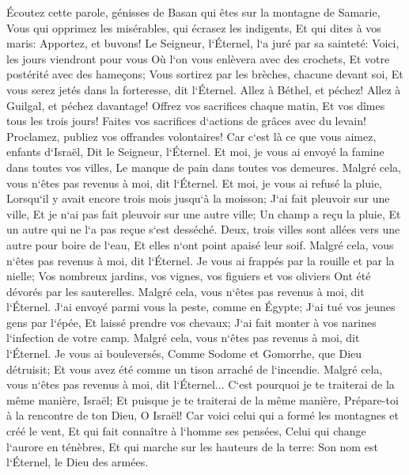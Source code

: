 \verse Écoutez cette parole, génisses de Basan qui êtes sur la montagne de Samarie, Vous qui opprimez les misérables, qui écrasez les indigents, Et qui dites à vos maris: Apportez, et buvons! 
\verse Le Seigneur, l`Éternel, l`a juré par sa sainteté: Voici, les jours viendront pour vous Où l`on vous enlèvera avec des crochets, Et votre postérité avec des hameçons; 
\verse Vous sortirez par les brèches, chacune devant soi, Et vous serez jetés dans la forteresse, dit l`Éternel. 
\verse Allez à Béthel, et péchez! Allez à Guilgal, et péchez davantage! Offrez vos sacrifices chaque matin, Et vos dîmes tous les trois jours! 
\verse Faites vos sacrifices d`actions de grâces avec du levain! Proclamez, publiez vos offrandes volontaires! Car c`est là ce que vous aimez, enfants d`Israël, Dit le Seigneur, l`Éternel. 
\verse Et moi, je vous ai envoyé la famine dans toutes vos villes, Le manque de pain dans toutes vos demeures. Malgré cela, vous n`êtes pas revenus à moi, dit l`Éternel. 
\verse Et moi, je vous ai refusé la pluie, Lorsqu`il y avait encore trois mois jusqu`à la moisson; J`ai fait pleuvoir sur une ville, Et je n`ai pas fait pleuvoir sur une autre ville; Un champ a reçu la pluie, Et un autre qui ne l`a pas reçue s`est desséché. 
\verse Deux, trois villes sont allées vers une autre pour boire de l`eau, Et elles n`ont point apaisé leur soif. Malgré cela, vous n`êtes pas revenus à moi, dit l`Éternel. 
\verse Je vous ai frappés par la rouille et par la nielle; Vos nombreux jardins, vos vignes, vos figuiers et vos oliviers Ont été dévorés par les sauterelles. Malgré cela, vous n`êtes pas revenus à moi, dit l`Éternel. 
\verse J`ai envoyé parmi vous la peste, comme en Égypte; J`ai tué vos jeunes gens par l`épée, Et laissé prendre vos chevaux; J`ai fait monter à vos narines l`infection de votre camp. Malgré cela, vous n`êtes pas revenus à moi, dit l`Éternel. 
\verse Je vous ai bouleversés, Comme Sodome et Gomorrhe, que Dieu détruisit; Et vous avez été comme un tison arraché de l`incendie. Malgré cela, vous n`êtes pas revenus à moi, dit l`Éternel... 
\verse C`est pourquoi je te traiterai de la même manière, Israël; Et puisque je te traiterai de la même manière, Prépare-toi à la rencontre de ton Dieu, O Israël! 
\verse Car voici celui qui a formé les montagnes et créé le vent, Et qui fait connaître à l`homme ses pensées, Celui qui change l`aurore en ténèbres, Et qui marche sur les hauteurs de la terre: Son nom est l`Éternel, le Dieu des armées. 

\chapter{}

